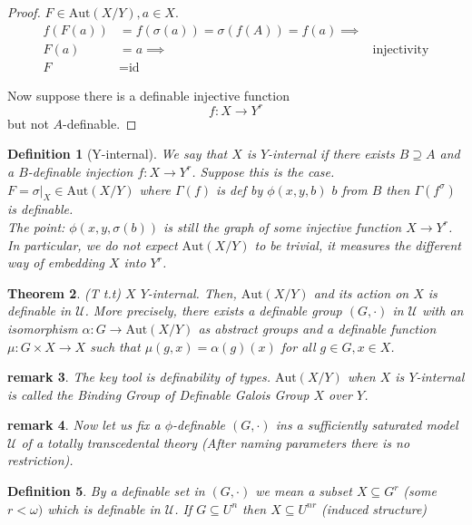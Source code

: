 \documentclass[letterpaper, 12pt]{article}
\newcommand{\fin}{\qquad \quad \hfill \framebox[1.75mm][l]{\,}}
\newcommand{\cU}{\mathcal{U}}
\newcommand{\Aut}{\mbox{Aut}}
\theoremstyle{stdthm}
\newtheorem{thm}{Theorem}[section]
\theoremstyle{stddef}
\newtheorem{defn}[thm]{Definition}
\newtheorem{rem}[thm]{remark} %
\theoremstyle{stdnonum}
\theoremstyle{stdqands}
\theoremstyle{stdbold}
\begin{document}
\begin{proof}
$F \in \Aut(X/Y), a\in X$. 
\begin{align*}
f(F(a)) &= f(\sigma(a)) = \sigma(f(A)) = f(a)  \implies \\
F(a) &= a \implies &\mbox{injectivity}\\
F &= \mbox{id}
\end{align*}

Now suppose there is a definable injective function 
\[ f:X \to Y^r \]
but not $A$-definable. 
\end{proof}

\begin{defn}[Y-internal]
We say that $X$ is $Y$-internal if there exists $B \supseteq A$ and a $B$-definable injection $f:X\to Y^r$. Suppose this is the case. $F = \sigma|_X \in \Aut(X/Y)$ where $\Gamma(f)$ is def by $\phi(x,y,b)$ $b$ from $B$ then $\Gamma(f^\sigma)$ is definable. \\

The point: $\phi(x,y,\sigma(b))$ is still the graph of some injective function $X\to Y^r$. In particular, we do not expect $\Aut(X/Y)$ to be trivial, it measures the different way of embedding $X$ into $Y^r$. 
\end{defn}

\begin{thm} (T t.t) 
$X$ $Y$-internal. Then, $\Aut(X/Y)$ and its action on $X$ is definable in $\cU$. More precisely, there exists a definable group $(G,\cdot)$ in $\cU$ with an isomorphism $\alpha: G \to \Aut(X/Y)$ as abstract groups and a definable function $\mu:G\times X \to X$ such that $\mu(g,x) = \alpha(g) (x)$ for all $g \in G, x \in X$. 
\end{thm}

\begin{rem}
The key tool is definability of types. $\Aut(X/Y)$ when $X$ is $Y$-internal  is called the Binding Group of Definable Galois Group $X$ over $Y$. 
\end{rem}

\begin{rem}
Now let us fix a $\phi$-definable $(G,\cdot)$ ins a sufficiently saturated model $\cU$ of a totally transcedental theory (After naming parameters there is no restriction). 
\end{rem}

\begin{defn}
By a definable set in $(G,\cdot)$ we mean a subset $X\subseteq G^r$ (some $r<\omega)$ which is definable in $\cU$. If $G \subseteq U^n$ then $X\subseteq U^{nr}$ (induced structure)
\end{defn}
\end{document}
